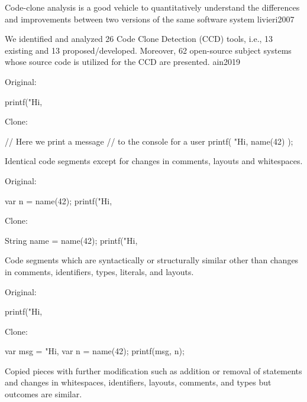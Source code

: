 \documentclass{article}
\begin{document}
  {Code-clone analysis is a good vehicle to quantitatively understand the differences and improvements between two versions of the same software system}
  {livieri2007}

  {We identified and analyzed 26 Code Clone Detection (CCD) tools, i.e., 13 existing and 13 proposed/developed. Moreover, 62 open-source subject systems whose source code is utilized for the CCD are presented.}
  {ain2019}

\begin{multicols}{2}
Original:\par
{\small\begin{ffcode}
printf("Hi, %
\end{ffcode}
}
Clone:\par
{\small\begin{ffcode}
// Here we print a message
// to the console for a user
printf(
  "Hi, %
  name(42)
);
\end{ffcode}
}
\par\columnbreak\par
Identical code segments except for changes in comments, layouts and whitespaces.
\end{multicols}
\plush{}

\begin{multicols}{2}
Original:\par
{\small\begin{ffcode}
var n = name(42);
printf("Hi, %
\end{ffcode}
}
Clone:\par
{\small\begin{ffcode}
String name = name(42);
printf("Hi, %
\end{ffcode}
}
\par\columnbreak\par
Code segments which are syntactically or structurally similar other than changes in comments, identifiers, types, literals, and layouts.
\end{multicols}
\plush{}

\begin{multicols}{2}
Original:\par
{\small\begin{ffcode}
printf("Hi, %
\end{ffcode}
}
Clone:\par
{\small\begin{ffcode}
var msg = "Hi, %
var n = name(42);
printf(msg, n);
\end{ffcode}
}
\par\columnbreak\par
Copied pieces with further modification such as addition or removal of statements and changes in whitespaces, identifiers, layouts, comments, and types but outcomes are similar.
\end{multicols}
\plush{}
\end{document}
